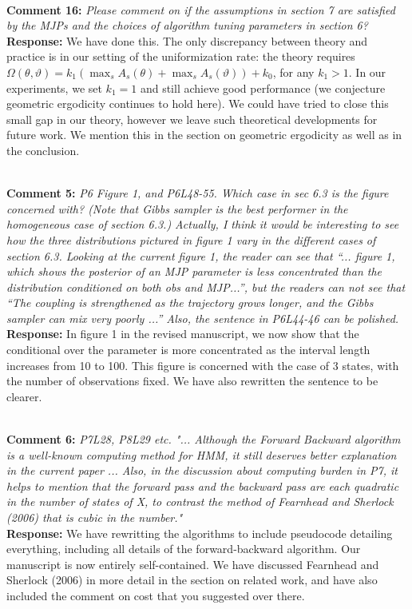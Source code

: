 \documentclass[11pt]{article}
\newcommand{\rev}[2]{\textbf{Comment #1: }\emph{#2}}
\newcommand{\resp}{\textbf{Response: }}
\begin{document}
~\\
\noindent \rev{16}{Please comment on if the assumptions in section 7 are satisfied by the MJPs and the
choices of algorithm tuning parameters in section 6?}\\
\resp{We have done this. The only discrepancy between theory and practice is in our setting of the uniformization rate: the theory requires $\Omega(\theta,\vartheta) = k_1 (\max_s A_s(\theta) + \max_s A_s(\vartheta)) + k_0$, for any $k_1 > 1$. In our experiments, we set $k_1 = 1$ and still achieve good performance (we conjecture geometric ergodicity continues to hold here). We could have tried to close this small gap in our theory, however we leave such theoretical developments for future work. We mention this in the section on geometric ergodicity as well as in the conclusion.}

~\\ 
\rev{5}{P6 Figure 1, and P6L48-55. Which case in sec 6.3 is the figure concerned with? (Note that Gibbs sampler is the best performer in the homogeneous case of section 6.3.) Actually, I think it would be interesting to see how the three distributions pictured in figure 1 vary in the different cases of section 6.3. Looking at the current figure 1, the reader can see that “... figure 1, which shows the posterior of an MJP parameter is less concentrated than the distribution conditioned on both obs and MJP...”, but the readers can not see that “The coupling is strengthened as the trajectory grows longer, and the Gibbs sampler can mix very poorly ...” 
Also, the sentence in P6L44-46 can be polished.}\\
\resp{ In figure 1 in the revised manuscript, we now show that the conditional over the parameter is more concentrated as the interval length increases from 10 to 100. This figure is concerned with the case of 3 states, with the number of observations fixed. We have also rewritten the sentence to be clearer.}

~\\
\noindent \rev{6}{P7L28, P8L29 etc. "... Although the Forward Backward algorithm is a well-known computing method for HMM, it still deserves better explanation in the current paper ...  Also, in the discussion about computing burden in P7, it helps to mention that the forward pass and the backward pass are each quadratic in the number of states of X, to contrast the method of Fearnhead and Sherlock (2006) that is cubic in the number."}
\\ 
\resp{We have rewritting the algorithms to include pseudocode detailing everything, including all details of the forward-backward algorithm. Our manuscript is now entirely self-contained. We have discussed Fearnhead and Sherlock (2006) in more detail in the section on related work, and have also included the comment on cost that you suggested over there.} 
\end{document}
